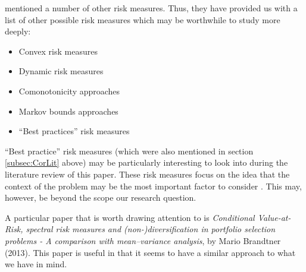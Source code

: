 \documentclass[12pt,a4paper]{article}
\newcommand{\bi}{\begin{itemize}}
\newcommand{\ei}{\end{itemize}}
\begin{document}
\cite{dowd2006after} mentioned a number of other risk measures. Thus, they have provided us with a list of other possible risk measures which may be worthwhile to study more deeply:

\bi
\item Convex risk measures
\item Dynamic risk measures
\item Comonotonicity approaches
\item Markov bounds approaches
\item “Best practices” risk measures
\ei
 
``Best practice'' risk measures (which were also mentioned in section \ref{subsec:CorLit} above) may be particularly interesting to look into during the literature review of this paper. These risk measures focus on the idea that the context of the problem may be the most important factor to consider \citep{dowd2006after}. This may, however, be beyond the scope our research question.

A particular paper that is worth drawing attention to is  \textit{Conditional Value-at-Risk, spectral risk measures and (non-)diversification in portfolio selection problems - A comparison with mean–variance analysis}, by Mario Brandtner (2013). This paper is useful in that it seems to have a similar approach to what we have in mind.
\end{document}
